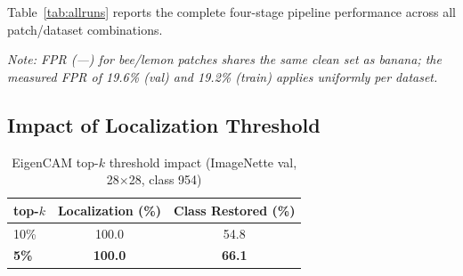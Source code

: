 \documentclass[conference]{IEEEtran}
\begin{document}
Table~\ref{tab:allruns} reports the complete four-stage pipeline performance across all patch/dataset combinations.

\begin{table}[h]
\centering
\caption{Module 10 end-to-end results: all target classes and datasets (28$\times$28 patch, top-5\% EigenCAM)}
\label{tab:allruns}
\end{table}

\textit{Note: FPR (---) for bee/lemon patches shares the same clean set as banana; the measured FPR of 19.6\% (val) and 19.2\% (train) applies uniformly per dataset.}

\subsection{Impact of Localization Threshold}

\begin{table}[h]
\centering
\caption{EigenCAM top-$k$ threshold impact (ImageNette val, 28$\times$28, class 954)}
\label{tab:topk}
\begin{tabular}{lcc}
\toprule
\textbf{top-$k$} & \textbf{Localization (\%)} & \textbf{Class Restored (\%)} \\
\midrule
10\% & 100.0 & 54.8 \\
\textbf{5\%}  & \textbf{100.0} & \textbf{66.1} \\
\bottomrule
\end{tabular}
\end{table}
\end{document}
